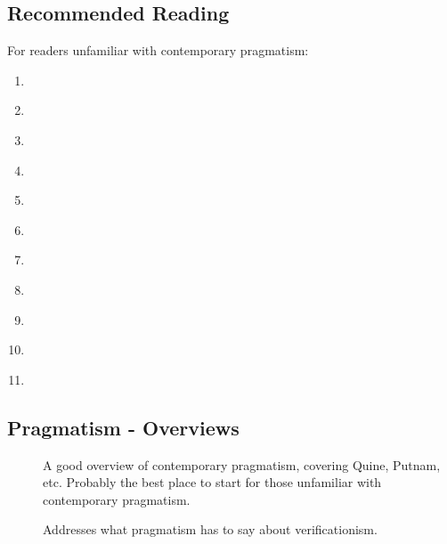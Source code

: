 \documentclass[11pt,twoside]{article}
\begin{document}
\clearpage
\appendix\begin{appendices}

\section{Recommended Reading}

For readers unfamiliar with contemporary pragmatism:

\begin{enumerate}
\item \cite{bacon_pragmatism:_2012}
\item \cite{brandom_perspectives_intro_2011}
\item \cite{putnam_three_2009}
\item \cite{quine_two_1951}
\item \cite{sellars_empiricism_1997}
\item \cite{davidson_nice_2005}
\item \cite{putnam_collapse_2002}
\item \cite{rorty_pmn}
\item \cite{brandom_articulating_2001}
\item \cite{price_expressivism_2011}
\item \cite{price_truth_2003}
\end{enumerate}


\subsection{Pragmatism - Overviews}
\begin{description}
\item [\cite{bacon_pragmatism:_2012}]  A good overview of contemporary pragmatism, covering Quine, Putnam, etc.  Probably the best place to start for those unfamiliar with contemporary pragmatism.
\item [\cite{bernstein_pragmatic_2010}]
\item [\cite{brandom_perspectives_2011}]
\item [\cite{dickstein_revival_1998}]
\item [\cite{kraut_varieties_1990}]
\item [\cite{putnam_pragmatism_1995}]  Addresses what pragmatism has to say about verificationism.
\item [\cite{schatzki_practice_2001}]
\end{description}


\end{appendices}
\end{document}
